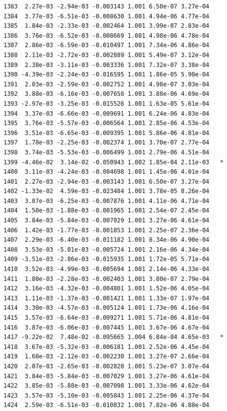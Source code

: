\documentclass[
  letterpaper,
  DIV=11,
  numbers=noendperiod]{scrartcl}
\begin{document}
\begin{verbatim}
1383  2.27e-03 -2.94e-03 -0.003143 1.001 6.50e-07 3.27e-04    
1384  3.77e-03 -6.51e-03 -0.008630 1.001 4.94e-06 4.77e-04    
1385  1.84e-03 -2.33e-03 -0.002464 1.001 3.99e-07 2.83e-04    
1386  3.76e-03 -6.52e-03 -0.008669 1.001 4.98e-06 4.78e-04    
1387  2.86e-03 -6.59e-03 -0.010497 1.001 7.34e-06 4.86e-04    
1388  2.11e-03 -2.72e-03 -0.002889 1.001 5.49e-07 3.12e-04    
1389  2.38e-03 -3.11e-03 -0.003336 1.001 7.32e-07 3.38e-04    
1390 -4.39e-03 -2.24e-03 -0.016595 1.001 1.86e-05 5.90e-04    
1391  2.03e-03 -2.59e-03 -0.002752 1.001 4.98e-07 3.03e-04    
1392  3.88e-03 -6.16e-03 -0.007658 1.001 3.88e-06 4.69e-04    
1393 -2.97e-03 -3.25e-03 -0.015526 1.001 1.63e-05 5.61e-04    
1394  3.37e-03 -6.66e-03 -0.009691 1.001 6.24e-06 4.83e-04    
1395  3.76e-03 -5.57e-03 -0.006564 1.001 2.85e-06 4.53e-04    
1396  3.51e-03 -6.65e-03 -0.009395 1.001 5.86e-06 4.81e-04    
1397  1.78e-03 -2.25e-03 -0.002374 1.001 3.70e-07 2.77e-04    
1398  3.74e-03 -5.53e-03 -0.006499 1.001 2.79e-06 4.51e-04    
1399 -4.46e-02  3.14e-02 -0.050943 1.002 1.85e-04 2.11e-03   *
1400  3.11e-03 -4.24e-03 -0.004698 1.001 1.45e-06 4.01e-04    
1401  2.27e-03 -2.94e-03 -0.003143 1.001 6.50e-07 3.27e-04    
1402 -1.33e-02  4.59e-03 -0.023484 1.001 3.78e-05 8.26e-04    
1403  3.87e-03 -6.25e-03 -0.007876 1.001 4.11e-06 4.71e-04    
1404  1.50e-03 -1.88e-03 -0.001965 1.001 2.54e-07 2.45e-04    
1405  3.84e-03 -5.84e-03 -0.007029 1.001 3.27e-06 4.61e-04    
1406  1.42e-03 -1.77e-03 -0.001853 1.001 2.25e-07 2.36e-04    
1407  2.29e-03 -6.40e-03 -0.011182 1.001 8.34e-06 4.90e-04    
1408  3.53e-03 -5.01e-03 -0.005724 1.001 2.16e-06 4.34e-04    
1409 -3.51e-03 -2.86e-03 -0.015935 1.001 1.72e-05 5.71e-04    
1410  3.52e-03 -4.99e-03 -0.005694 1.001 2.14e-06 4.33e-04    
1411  1.80e-03 -2.28e-03 -0.002403 1.001 3.80e-07 2.79e-04    
1412  3.16e-03 -4.32e-03 -0.004801 1.001 1.52e-06 4.05e-04    
1413  1.11e-03 -1.37e-03 -0.001421 1.001 1.33e-07 1.97e-04    
1414  3.30e-03 -4.57e-03 -0.005124 1.001 1.73e-06 4.16e-04    
1415  3.57e-03 -6.64e-03 -0.009271 1.001 5.71e-06 4.81e-04    
1416  3.87e-03 -6.06e-03 -0.007445 1.001 3.67e-06 4.67e-04    
1417 -9.22e-02  7.48e-02 -0.095665 1.004 6.84e-04 4.65e-03   *
1418  3.67e-03 -5.32e-03 -0.006181 1.001 2.52e-06 4.45e-04    
1419  1.68e-03 -2.12e-03 -0.002230 1.001 3.27e-07 2.66e-04    
1420  2.07e-03 -2.65e-03 -0.002820 1.001 5.23e-07 3.07e-04    
1421  3.84e-03 -5.84e-03 -0.007029 1.001 3.27e-06 4.61e-04    
1422  3.85e-03 -5.88e-03 -0.007098 1.001 3.33e-06 4.62e-04    
1423  3.57e-03 -5.10e-03 -0.005843 1.001 2.25e-06 4.37e-04    
1424  2.59e-03 -6.51e-03 -0.010832 1.001 7.82e-06 4.88e-04    

\end{verbatim}
\end{document}
